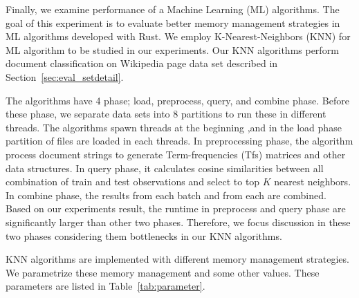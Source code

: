 Finally, we examine performance of a Machine Learning (ML) algorithms. 
The goal of this experiment is to evaluate better memory management strategies in ML algorithms developed with Rust.
We employ K-Nearest-Neighbors (KNN) for ML algorithm to be studied in our experiments.
Our KNN algorithms perform document classification on Wikipedia page data set described in Section~\ref{sec:eval_setdetail}. 

The algorithms have 4 phase; load, preprocess, query, and combine phase. 
Before these phase, we separate data sets into 8 partitions to run these in different threads. 
The algorithms spawn threads at the beginning ,and in the load phase partition of files are loaded in each threads. 
In preprocessing phase, the algorithm process document strings to generate Term-frequencies (Tfs) matrices and other data structures. 
In query phase, it calculates cosine similarities between all combination of train and test observations and select to top \(K\) nearest neighbors. 
In combine phase, the results from each batch and from each are combined. 
Based on our experiments result, the runtime in preprocess and query phase are significantly larger than other two phases.
Therefore, we focus discussion in these two phases considering them bottlenecks in our KNN algorithms.

KNN algorithms are implemented with different memory management strategies. 
We parametrize these memory management and some other values. These parameters are listed in Table~\ref{tab:parameter}. 

